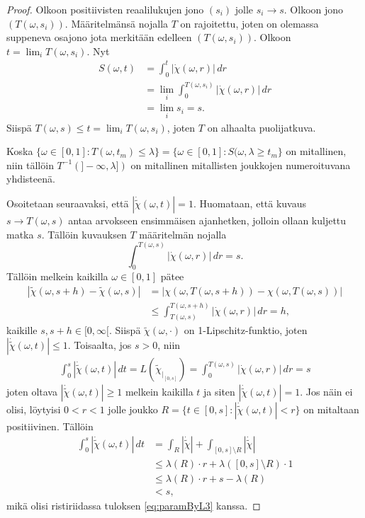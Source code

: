 \documentclass[12pt,oneside,a4paper]{amsbook} %
\begin{document}
\begin{proof}
    Olkoon positiivisten reaalilukujen jono $(s_i)$ jolle $s_i \to s$. Olkoon jono $(T(\omega, s_i))$. Määritelmänsä nojalla $T$ on rajoitettu, joten on olemassa suppeneva osajono jota merkitään edelleen $(T(\omega, s_i))$. Olkoon $t = \lim_i T(\omega, s_i)$. Nyt
    \begin{align*}
        S(\omega, t) &= \int_0^t |\dot\chi(\omega, r)| \, dr \\
        &= \lim_i\int_0^{T(\omega, s_i)} |\dot\chi(\omega, r)| \, dr \\
        &= \lim_i s_i = s.
    \end{align*}
    Siispä $T(\omega, s) \le t = \lim_i T(\omega, s_i)$, joten $T$ on alhaalta puolijatkuva.
    
    Koska $\{\omega \in [0, 1] : T(\omega, t_m) \le \lambda\} = \{\omega\in [0, 1] : S(\omega, \lambda \ge t_m\}$ on mitallinen, niin tällöin $T^{-1}(]-\infty, \lambda])$ on mitallinen mitallisten joukkojen numeroituvana yhdisteenä.
    
    Osoitetaan seuraavaksi, että $|\dot{\tilde{\chi}}(\omega, t)| = 1$. Huomataan, että kuvaus $s\to T(\omega, s)$ antaa arvokseen ensimmäisen ajanhetken, jolloin ollaan kuljettu matka $s$. Tällöin kuvauksen $T$ määritelmän nojalla 
    \begin{equation} \label{eq:paramByL1}
        \int_0^{T(\omega,s)} |\dot \chi(\omega, r)| \, dr = s.
    \end{equation}
    Tällöin melkein kaikilla $\omega \in [0, 1]$ pätee
    \begin{align*}
        |\tilde\chi(\omega, s + h) - \tilde\chi(\omega, s)| &= |\chi(\omega, T(\omega, s+h)) - \chi(\omega, T(\omega, s))| \\
        &\le \int_{T(\omega,s)}^{T(\omega, s+h)}|\dot \chi(\omega, r)| \, dr = h,
    \end{align*}
    kaikille $s, s+h \in [0, \infty[$. Siispä $\tilde \chi(\omega, \cdot)$ on 1-Lipschitz-funktio, joten $|\dot{\tilde \chi}(\omega, t)| \le 1$. Toisaalta, jos $s > 0$, niin
    \begin{align}
        \label{eq:paramByL3} \int_0^s |\dot{\tilde \chi}(\omega, t)| \, dt = L(\tilde\chi_{|_{[0, s]}})= \int_0^{T(\omega, s)} |\dot \chi(\omega, r)| \, dr = s
    \end{align}
    joten oltava $|\dot{\tilde \chi}(\omega, t)| \ge 1$ melkein kaikilla $t$ ja siten $|\dot{\tilde \chi}(\omega, t)| = 1$. Jos näin ei olisi, löytyisi $0 < r < 1$ jolle joukko $R = \{t \in [0, s] : |\dot{\tilde \chi}(\omega, t)|< r\}$ on mitaltaan positiivinen. Tällöin
    \begin{align*}
        \int_0^s |\dot{\tilde \chi}(\omega, t)| \, dt &= \int_R |\dot{\tilde \chi}| + \int_{[0,s]\setminus R} |\dot{\tilde \chi}| \\
        &\le \lambda(R) \cdot r + \lambda([0,s]\setminus R) \cdot 1 \\
        &\le \lambda(R) \cdot r + s - \lambda(R) \\
        &< s,
    \end{align*}
    mikä olisi ristiriidassa tuloksen \eqref{eq:paramByL3} kanssa.


\end{proof}
\end{document}
